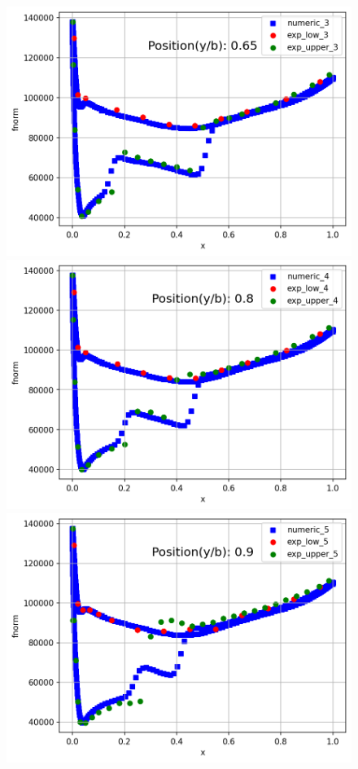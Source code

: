 \documentclass[11pt]{article}
\begin{document}
\begin{figure}[h!]
\begin{minipage}{.49\textwidth}
    \includegraphics[width = 1\textwidth]{3.png}
\end{minipage}
\begin{minipage}{.49\textwidth}
    \centering
    \includegraphics[width = 1\textwidth]{4.png}
\end{minipage}
\begin{minipage}{.49\textwidth}
    \centering
    \includegraphics[width = 1\textwidth]{5.png}

\end{minipage}
\end{figure}
\end{document}
